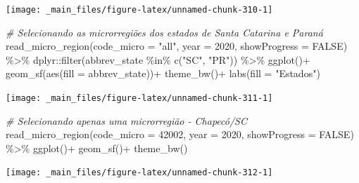\documentclass[
  brazilian,
]{book}
\newenvironment{Shaded}{\begin{snugshade}}{\end{snugshade}}
\newcommand{\AttributeTok}[1]{\textcolor[rgb]{0.77,0.63,0.00}{#1}}
\newcommand{\CommentTok}[1]{\textcolor[rgb]{0.56,0.35,0.01}{\textit{#1}}}
\newcommand{\ConstantTok}[1]{\textcolor[rgb]{0.00,0.00,0.00}{#1}}
\newcommand{\DecValTok}[1]{\textcolor[rgb]{0.00,0.00,0.81}{#1}}
\newcommand{\FunctionTok}[1]{\textcolor[rgb]{0.00,0.00,0.00}{#1}}
\newcommand{\NormalTok}[1]{#1}
\newcommand{\SpecialCharTok}[1]{\textcolor[rgb]{0.00,0.00,0.00}{#1}}
\newcommand{\StringTok}[1]{\textcolor[rgb]{0.31,0.60,0.02}{#1}}
\begin{document}
\begin{center}\texttt{[image: \_main\_files/figure-latex/unnamed-chunk-310-1]} \end{center}

\begin{Shaded}
\begin{Highlighting}[]
\CommentTok{\# Selecionando as microrregiões dos estados de Santa Catarina e Paraná}
\FunctionTok{read\_micro\_region}\NormalTok{(}\AttributeTok{code\_micro =} \StringTok{"all"}\NormalTok{,}
                  \AttributeTok{year =} \DecValTok{2020}\NormalTok{,}
                  \AttributeTok{showProgress =} \ConstantTok{FALSE}\NormalTok{) }\SpecialCharTok{\%\textgreater{}\%} 
\NormalTok{  dplyr}\SpecialCharTok{::}\FunctionTok{filter}\NormalTok{(abbrev\_state }\SpecialCharTok{\%in\%} \FunctionTok{c}\NormalTok{(}\StringTok{"SC"}\NormalTok{, }\StringTok{"PR"}\NormalTok{)) }\SpecialCharTok{\%\textgreater{}\%} 
  \FunctionTok{ggplot}\NormalTok{()}\SpecialCharTok{+}
  \FunctionTok{geom\_sf}\NormalTok{(}\FunctionTok{aes}\NormalTok{(}\AttributeTok{fill =}\NormalTok{ abbrev\_state))}\SpecialCharTok{+}
  \FunctionTok{theme\_bw}\NormalTok{()}\SpecialCharTok{+}
  \FunctionTok{labs}\NormalTok{(}\AttributeTok{fill =} \StringTok{"Estados"}\NormalTok{)}
\end{Highlighting}
\end{Shaded}

\begin{center}\texttt{[image: \_main\_files/figure-latex/unnamed-chunk-311-1]} \end{center}

\begin{Shaded}
\begin{Highlighting}[]
\CommentTok{\# Selecionando apenas uma microrregião {-} Chapecó/SC}
\FunctionTok{read\_micro\_region}\NormalTok{(}\AttributeTok{code\_micro =} \DecValTok{42002}\NormalTok{,}
                  \AttributeTok{year =} \DecValTok{2020}\NormalTok{,}
                  \AttributeTok{showProgress =} \ConstantTok{FALSE}\NormalTok{) }\SpecialCharTok{\%\textgreater{}\%} 
  \FunctionTok{ggplot}\NormalTok{()}\SpecialCharTok{+}
  \FunctionTok{geom\_sf}\NormalTok{()}\SpecialCharTok{+}
  \FunctionTok{theme\_bw}\NormalTok{()}
\end{Highlighting}
\end{Shaded}

\begin{center}\texttt{[image: \_main\_files/figure-latex/unnamed-chunk-312-1]} \end{center}
\end{document}
